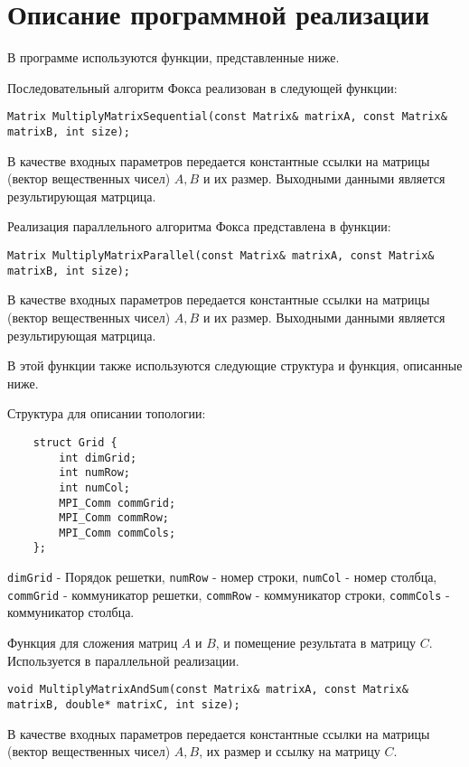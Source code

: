 \documentclass{report}
\begin{document}
\section*{Описание программной реализации}
В программе используются функции, представленные ниже.
\par Последовательный алгоритм Фокса реализован в следующей функции:
\begin{lstlisting}
Matrix MultiplyMatrixSequential(const Matrix& matrixA, const Matrix& matrixB, int size);
\end{lstlisting}
\par В качестве входных параметров передается константные ссылки на матрицы (вектор вещественных чисел) {\itshape $A, B$} и их размер. Выходными данными является результирующая матрцица.
\par Реализация параллельного алгоритма Фокса представлена в функции:
\begin{lstlisting}
Matrix MultiplyMatrixParallel(const Matrix& matrixA, const Matrix& matrixB, int size);
\end{lstlisting}
\par В качестве входных параметров передается константные ссылки на матрицы (вектор вещественных чисел) {\itshape $A, B$} и их размер. Выходными данными является результирующая матрцица.
\par В этой функции также используются следующие структура и функция, описанные ниже.
\par Структура для описании топологии:
\begin{lstlisting}
    struct Grid {
        int dimGrid;
        int numRow;
        int numCol;
        MPI_Comm commGrid;
        MPI_Comm commRow;
        MPI_Comm commCols;
    };
\end{lstlisting}
\par \verb|dimGrid| - Порядок решетки, \verb|numRow| - номер строки, \verb|numCol| - номер столбца, \verb|commGrid| - коммуникатор решетки, \verb|commRow| - коммуникатор строки, \verb|commCols| - коммуникатор столбца.
\par Функция для сложения матриц {\itshape $A$} и {\itshape $B$}, и помещение результата в матрицу {\itshape $C$}. Используется в параллельной реализации.
\begin{lstlisting}
void MultiplyMatrixAndSum(const Matrix& matrixA, const Matrix& matrixB, double* matrixC, int size);
\end{lstlisting}
\par В качестве входных параметров передается константные ссылки на матрицы (вектор вещественных чисел) {\itshape $A, B$}, их размер и ссылку на матрицу {\itshape $C$}.
\end{document}
